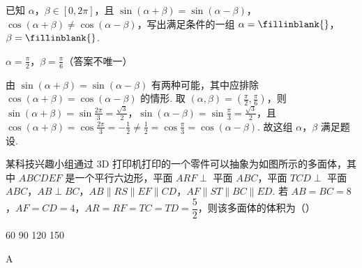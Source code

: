 \begin{problem}
已知 \(\alpha\)，\(\beta\in[0,2\pi]\)，且 \(\sin(\alpha+\beta)=\sin(\alpha-\beta)\)，\(\cos(\alpha+\beta)\ne\cos(\alpha-\beta)\)，写出满足条件的一组 \(\alpha=\fillinblank{}\)，\(\beta=\fillinblank{}\).
\end{problem}

\begin{answer}
\(\alpha=\frac{\pi}{2}\)，\(\beta=\frac{\pi}{6}\)（答案不唯一）
\end{answer}

\begin{solution}
由 \(\sin(\alpha+\beta)=\sin(\alpha-\beta)\) 有两种可能，其中应排除 \(\cos(\alpha+\beta)=\cos(\alpha-\beta)\) 的情形. 取 \((\alpha,\beta)=\left(\frac{\pi}{2},\frac{\pi}{6}\right)\)，则
\(\sin(\alpha+\beta)=\sin\frac{2\pi}{3}=\frac{\sqrt3}{2}\)，\(\sin(\alpha-\beta)=\sin\frac{\pi}{3}=\frac{\sqrt3}{2}\)，且 \(\cos(\alpha+\beta)=\cos\frac{2\pi}{3}=-\frac12\ne\frac12=\cos\frac{\pi}{3}=\cos(\alpha-\beta)\).
故这组 \(\alpha\)，\(\beta\) 满足题设.
\end{solution}

\begin{problem}
某科技兴趣小组通过 3D 打印机打印的一个零件可以抽象为如图所示的多面体，其中 \(ABCDEF\) 是一个平行六边形，平面 \(ARF\perp\) 平面 \(ABC\)，平面 \(TCD\perp\) 平面 \(ABC\)，\(AB\perp BC\)，\(AB\parallel RS\parallel EF\parallel CD\)，\(AF\parallel ST\parallel BC\parallel ED\). 若 \(AB=BC=8\)，\(AF=CD=4\)，\(AR=RF=TC=TD=\dfrac52\)，则该多面体的体积为（\quad）


\choices
    {60}
    {90}
    {120}
    {150}
\end{problem}

\begin{answer}
A
\end{answer}

